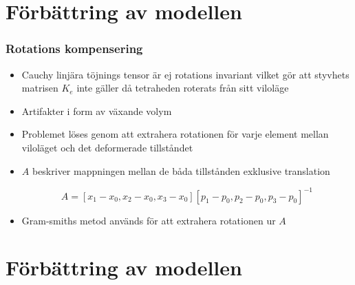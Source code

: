 \documentclass{beamer}
\begin{document}
\section{Förbättring av modellen}


\begin{frame}
\frametitle{Rotations kompensering}

\begin{itemize}
\item Cauchy linjära töjnings tensor är ej rotations invariant vilket gör att styvhets matrisen $K_{e}$ inte gäller då tetraheden roterats från sitt viloläge 

\item Artifakter i form av växande volym

\item Problemet löses genom att extrahera rotationen för varje element mellan viloläget och det deformerade tillståndet

\item $A$ beskriver mappningen mellan de båda tillstånden exklusive translation

\begin{equation}\label{eqn:stiffnessmatrix}
    A = [x_{1}-x_{0}, x_{2}-x_{0}, x_{3}-x_{0}][p_{1}-p_{0}, p_{2}-p_{0}, p_{3}-p_{0}]^{-1}
\end{equation}

\item Gram-smiths metod används för att extrahera rotationen ur $A$
\end{itemize}
\end{frame}

\section{Förbättring av modellen}
\end{document}
